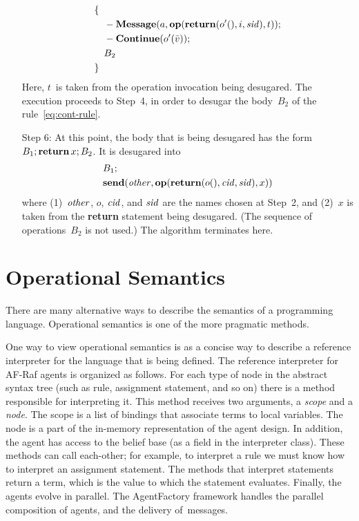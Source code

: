 \documentclass[a4paper,12pt,oneside,fleqn]{book} %
\begin{document}
\begin{itemize}
\begin{align}
\begin{aligned}
&\{ \\
&\quad -{\bf Message}(a,{\bf op}({\bf return}(o'(),i,{\it sid}), t)); \\
&\quad -{\bf Continue}(o'(\bar v)); \\
&\quad B_2 \\
&\}
\end{aligned}
\label{eq:cont-rule}
\end{align}
  Here, $t$~is taken from the operation invocation being desugared.  The
  execution proceeds to Step~4, in order to desugar the body~$B_2$ of the
  rule~\eqref{eq:cont-rule}.
\item[Step 6:]
  At this point, the body that is being desugared has the form $B_1;{\bf
  return}\,x;B_2$. It is desugared into
\begin{align}
\begin{aligned}
&B_1; \\
&{\bf send}({\it other}, {\bf op}({\bf return}(o(), {\it cid}, {\it sid}), x))
\end{aligned}
\end{align}
  where (1)~$\it other$, $o$, $\it cid$, and $\it sid$ are the names chosen
  at Step~2, and (2)~$x$ is taken from the {\bf return} statement being
  desugared. (The sequence of operations~$B_2$ is not used.) The algorithm
  terminates here.
\end{itemize}

\section{Operational Semantics}\label{sec:opsem} %

There are many alternative ways to describe the semantics of a programming
language. Operational semantics is one of the more pragmatic methods.

One way to view operational semantics is as a concise way to describe a
reference interpreter for the language that is being defined. The reference
interpreter for AF-Raf agents is organized as follows. For each type of
node in the abstract syntax tree (such as rule, assignment statement, and
so on) there is a method responsible for interpreting it. This method
receives two arguments, a \emph{scope} and a \emph{node}. The scope is a
list of bindings that associate terms to local variables. The node is a
part of the in-memory representation of the agent design. In addition, the
agent has access to the belief base (as a field in the interpreter class).
These methods can call each-other; for example, to interpret a rule we must
know how to interpret an assignment statement. The methods that interpret
statements return a term, which is the value to which the statement
evaluates. Finally, the agents evolve in parallel. The AgentFactory
framework handles the parallel composition of agents, and the delivery
of~messages.
\end{document}

